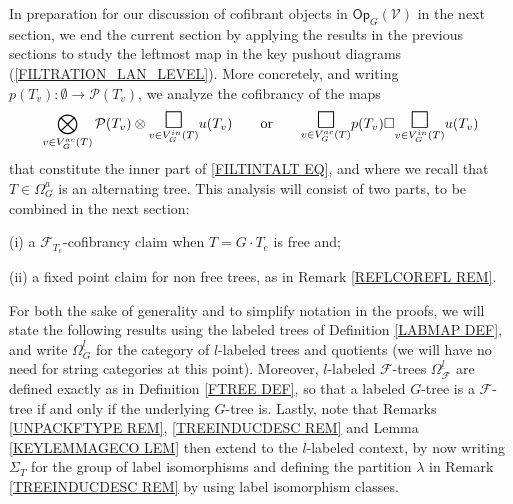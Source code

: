 \documentclass[a4paper,10pt
,draft
]{article}%
\numberwithin{equation}{section}
\numberwithin{figure}{section}
\theoremstyle{definition} %
\renewcommand{\P}{\ensuremath{\mathcal P}}
\newcommand{\1}{\ensuremath{\mathbbm 1}}%
\begin{document}
In preparation for our discussion of cofibrant objects in $\mathsf{Op}_G(\mathcal{V})$
in the next section, 
we end the current section by applying 
the results in the previous sections to study the leftmost map in the key pushout diagrams
(\ref{FILTRATION_LAN_LEVEL}).
More concretely, 
and writing 
$p(T_v) \colon \emptyset \to \mathcal{P}(T_v)$,
we analyze the cofibrancy of the maps
\[
	\bigotimes\limits_{v \in V_{G}^{ac}(T)}\P(T_v) \otimes
	\underset{v \in V_{G}^{in}(T)}
	{\mathlarger{\mathlarger{\mathlarger{\square}}}}
	u(T_v)
\qquad
\text{or}
\qquad
	\underset{v \in V_{G}^{ac}(T)}
	{\mathlarger{\mathlarger{\mathlarger{\square}}}}
	p(T_v) 
		\square
	\underset{v \in V_{G}^{in}(T)}
	{\mathlarger{\mathlarger{\mathlarger{\square}}}}
	u(T_v)
\]
that constitute the inner part of \eqref{FILTINTALT EQ}, and where we recall that $T \in \Omega_G^a$ is an alternating tree.
This analysis will consist of two parts, to be combined in the next section:
\begin{inparaenum}
\item[(i)] a $\mathcal{F}_{T_e}$-cofibrancy claim when $T=G \cdot T_e$ is free and;
\item[(ii)] a fixed point claim for non free trees, 
as in Remark \ref{REFLCOREFL REM}.
\end{inparaenum}


For both the sake of generality and to simplify notation in the proofs, we will state the following results using the labeled trees 
of Definition \ref{LABMAP DEF},
and write 
$\Omega_G^{\underline{l}}$ for the category of 
$l$-labeled trees and quotients 
(we will have no need for string categories at this point).
Moreover, $l$-labeled $\mathcal{F}$-trees 
$\Omega_{\mathcal{F}}^{\underline{l}}$ are
defined exactly as in Definition \ref{FTREE DEF},
so that a labeled $G$-tree is a $\mathcal{F}$-tree 
if and only if the underlying $G$-tree is.
Lastly, note that Remarks \ref{UNPACKFTYPE REM}, \ref{TREEINDUCDESC REM}
and Lemma \ref{KEYLEMMAGECO LEM} then extend to the $l$-labeled context, by now writing $\Sigma_T$ for the group of label isomorphisms and defining the partition $\lambda$ 
in Remark \ref{TREEINDUCDESC REM}
by using label isomorphism classes.
\end{document}
